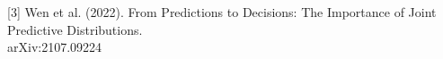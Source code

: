 \documentclass[preview]{standalone}
\begin{document}
\begin{center}
[3] Wen et al. (2022). From Predictions to Decisions: The Importance of Joint Predictive Distributions.\\arXiv:2107.09224
\end{center}
\end{document}
